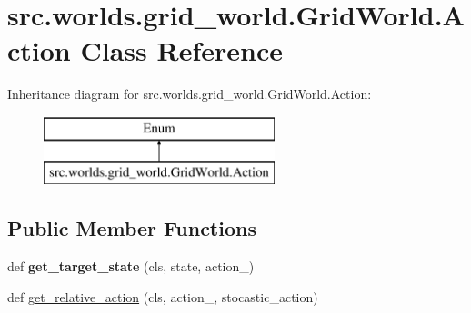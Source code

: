 \hypertarget{classsrc_1_1worlds_1_1grid__world_1_1_grid_world_1_1_action}{}\section{src.\+worlds.\+grid\+\_\+world.\+Grid\+World.\+Action Class Reference}
\label{classsrc_1_1worlds_1_1grid__world_1_1_grid_world_1_1_action}
Inheritance diagram for src.\+worlds.\+grid\+\_\+world.\+Grid\+World.\+Action\+:\begin{figure}[H]
\begin{center}
\leavevmode
\includegraphics[height=2.000000cm]{classsrc_1_1worlds_1_1grid__world_1_1_grid_world_1_1_action}
\end{center}
\end{figure}
\subsection*{Public Member Functions}
\begin{DoxyCompactItemize}
\item 
\mbox{\label{classsrc_1_1worlds_1_1grid__world_1_1_grid_world_1_1_action_ae510f46f10ef1a749ddfdf18773fbd65}} 
def {\bfseries get\+\_\+target\+\_\+state} (cls, state, action\+\_\+)
\item 
def \hyperlink{classsrc_1_1worlds_1_1grid__world_1_1_grid_world_1_1_action_a7048c38e1cf8960c605f01d34d7bfcf5}{get\+\_\+relative\+\_\+action} (cls, action\+\_\+, stocastic\+\_\+action)
\end{DoxyCompactItemize}
